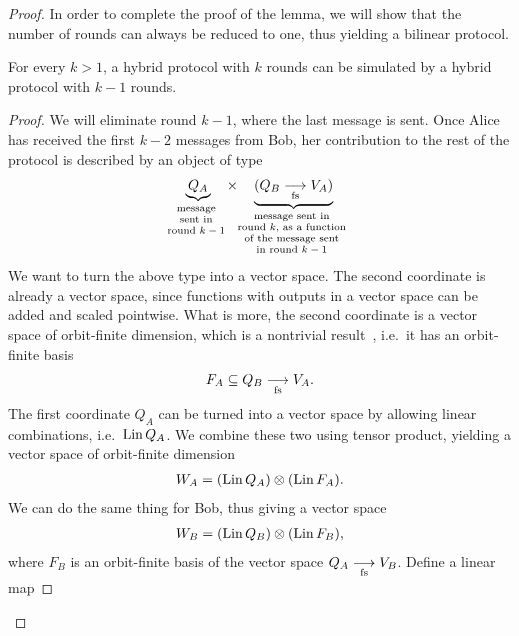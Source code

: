 \begin{theorem}
\begin{proof}
    In order to complete the proof of the lemma, we will show that the number of rounds can always be reduced to one, thus yielding a bilinear protocol. 

    \begin{claim}\label{claim:reduce-round}
        For every $k > 1$, a hybrid protocol with $k$ rounds can be simulated by a hybrid protocol with $k-1$ rounds.
    \end{claim}
    \begin{proof}
        We will eliminate round $k-1$, where the last message is sent. Once Alice has received the first $k-2$ messages from Bob, her contribution to the rest of the protocol is described by an object of type 
          \begin{align}\label{eq:contribution-last-two-rounds}
            \myunderbrace{Q_A}{message \\ sent in \\ round $k-1$} \quad \times \quad  \myunderbrace{(\fsfun  {Q_B} {V_A})}{message sent in \\ round $k$, as a function \\ of the message sent \\ in  round $k-1$}
        \end{align}
        We want to turn the above type into a vector space. The second coordinate is already a vector space, since functions with outputs in a vector space can be added and scaled pointwise. What is more, the  second coordinate  is  a vector space of orbit-finite dimension, which is a nontrivial result~\cite[Section 8.3]{bojanczyk_slightly}, i.e.~it has an orbit-finite basis  
        \begin{align*}
        F_A \subseteq Q_B \underset{\text{fs}}{\longrightarrow} V_A.  
        \end{align*}
        The first coordinate $Q_A$ can be turned into a vector space by  allowing linear combinations, i.e.~$\operatorname{Lin} Q_A$. We combine these two using tensor product, yielding a vector space of orbit-finite dimension
        \begin{align*}
           W_A =  (\operatorname{Lin} Q_A) \otimes (\operatorname{Lin} F_A).
        \end{align*}
        We can do the same thing for Bob, thus giving a vector space 
        \begin{align*}
           W_B =  (\operatorname{Lin} Q_B) \otimes (\operatorname{Lin} F_B),
        \end{align*}
        where $F_B$ is an orbit-finite basis of the vector space $Q_A \underset{\text{fs}}{\longrightarrow} V_B$. Define a linear map

\end{proof}
\end{proof}
\end{theorem}
